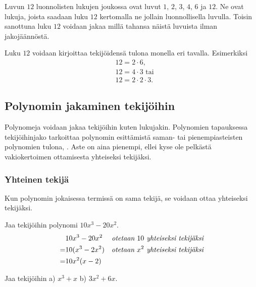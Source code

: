 Luvun $12$  luonnolisten lukujen joukossa ovat luvut $1$, $2$, $3$, $4$, $6$ ja $12$. Ne ovat lukuja, joista saadaan luku $12$ kertomalla ne jollain luonnollisella luvulla. Toisin sanottuna luku $12$ voidaan jakaa millä tahansa näistä luvuista ilman jakojäännöstä.

\begin{esimerkki}
Luku $12$ voidaan kirjoittaa tekijöidensä tulona monella eri tavalla. Esimerkiksi
\begin{align*}
&12 = 2 \cdot 6, \\
&12= 4 \cdot 3 \text{ tai} \\
&12= 2 \cdot 2 \cdot 3.
\end{align*}
\end{esimerkki}

\subsection{Polynomin jakaminen tekijöihin}


Polynomeja voidaan jakaa tekijöihin kuten lukujakin. Polynomien tapauksessa tekijöihinjako tarkoittaa polynomin esittämistä saman- tai pienempiasteisten polynomien tulona, . Aste on aina pienempi, ellei kyse ole pelkästä vakiokertoimen ottamisesta yhteiseksi tekijäksi.

\subsubsection*{Yhteinen tekijä}

Kun polynomin jokaisessa termissä on sama tekijä, se voidaan ottaa yhteiseksi tekijäksi.

\newpage %
\begin{esimerkki}
Jaa tekijöihin polynomi $10x^3-20x^2$.
\begin{align*}
& 10x^3-20x^2 &\emph{otetaan $10$ yhteiseksi tekijäksi}\\
=& 10(x^3-2x^2) &\emph{otetaan $x^2$ yhteiseksi tekijäksi} \\
=& 10x^2(x-2)  
\end{align*}
\end{esimerkki}

\begin{esimerkki}
Jaa tekijöihin \quad a) $x^3+x$ \quad b) $3x^2+6x.$
\end{esimerkki}

